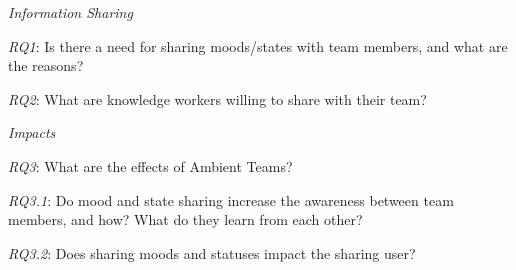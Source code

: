 


\bigskip\noindent\textit{Information Sharing}

\smallskip\noindent\textit{RQ1}: Is there a need for sharing moods/states with team members, and what are the reasons?

\smallskip\noindent\textit{RQ2}: What are knowledge workers willing to share with their team?

\medskip\noindent\textit{Impacts}

\smallskip\noindent\textit{RQ3}: What are the effects of Ambient Teams?

\setlength{\leftskip}{0.5cm}
\smallskip\noindent\textit{RQ3.1}: Do mood and state sharing increase the awareness between team members, and how? What do they learn from each other?

\smallskip\noindent\textit{RQ3.2}: Does sharing moods and statuses impact the sharing user?


